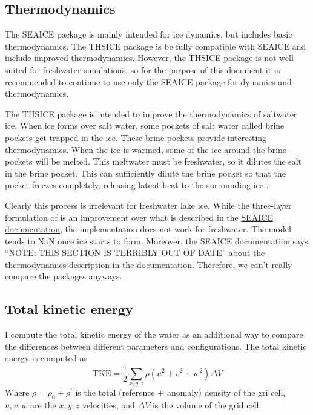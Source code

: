 \documentclass[11pt]{article}
\begin{document}
\subsection{Thermodynamics}
The SEAICE package is mainly intended for ice dynamics, but includes basic thermodynamics. The THSICE package is be fully compatible with SEAICE and include improved thermodynamics. However, the THSICE package is not well suited for freshwater simulations, so for the purpose of this document it is recommended to continue to use only the SEAICE package for dynamics and thermodynamics.

The THSICE package is intended to improve the thermodynamics of saltwater ice. When ice forms over salt water, some pockets of salt water called brine pockets get trapped in the ice. These brine pockets provide interesting thermodynamics. When the ice is warmed, some of the ice around the brine pockets will be melted. This meltwater must be freshwater, so it dilutes the salt in the brine pocket. This can sufficiently dilute the brine pocket so that the pocket freezes completely, releasing latent heat to the surrounding ice \cite{Winton2000}.

Clearly this process is irrelevant for freshwater lake ice. While the three-layer formulation of \cite{Winton2000} is an improvement over what is described in the \href{http://mitgcm.org/public/r2_manual/final/online_documents/node254.html}{SEAICE documentation}, the implementation does not work for freshwater. The model tends to NaN once ice starts to form. Moreover, the SEAICE documentation says ``NOTE: THIS SECTION IS TERRIBLY OUT OF DATE'' about the thermodynamics description in the documentation. Therefore, we can't really compare the packages anyways.

\subsection{Total kinetic energy}
I compute the total kinetic energy of the water as an additional way to compare the differences between different parameters and configurations. The total kinetic energy is computed as
\begin{equation}
\textrm{TKE} = \frac{1}{2} \sum_{x, y, z} \rho \left ( u^2 + v^2 + w^2\right ) \Delta V
\end{equation}
Where $\rho = \rho_0 + \rho^{\prime}$ is the total (reference + anomaly) density of the gri cell, $u, v, w$ are the $x, y, z$ velocities, and $\Delta V$ is the volume of the grid cell.
\end{document}
